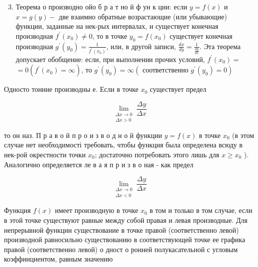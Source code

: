 \documentclass[10pt]{article}
\begin{document}
\begin{enumerate}

  \setcounter{enumi}{2}

  \item Теорема о производно ойо б р а т но й ф ун к ции: если $y=f(x)$ и $x=g(y)-$ две взаимно обратные возрастающие (или убывающие) функции, заданные на нек-рых интервалах, и существует конечная производная $f^{\prime}\left(x_{0}\right) \neq 0$, то в точке $y_{0}=f\left(x_{0}\right)$ существует конечная производная $g^{\prime}\left(y_{0}\right)=\frac{1}{f^{\prime}\left(x_{0}\right)}$, или, в другой записи, $\frac{d x}{d y}=\frac{1}{\frac{d y}{d x}}$. Эта теорема допускает обобщение: если, при выполнении прочих условий, $f^{\prime}\left(x_{0}\right)=$ $=0\left(f^{\prime}\left(x_{0}\right)=\infty\right)$, то $g^{\prime}\left(y_{0}\right)=\infty\left(\right.$ соответственно $\left.g^{\prime}\left(y_{0}\right)=0\right)$

\end{enumerate}



Односто тонние производны е. Если в точке $x_{0}$ существует предел



\[

\lim _{\substack{\Delta x \rightarrow 0 \\ \Delta x>0}} \frac{\Delta y}{\Delta x}

\]



то он наз. П р а в о й п р о и з в о д н о й функции $y=f(x)$ в точке $x_{0}$ (в этом случае нет необходимості требовать, чтобы функция была определена всюду в нек-рой окрестности точки $x_{0}$; достаточно потребовать этого лишь для $x \geqslant x_{0}$ ). Аналогично определяется ле в а я п р и з в о ная - как предел



\[

\lim _{\substack{\Delta x \rightarrow 0 \\ \Delta x<0}} \frac{\Delta y}{\Delta x}

\]



Функция $f(x)$ имеет производную в точке $x_{0}$ в том и только в том случае, если в этой точке существуют равные между собой правая и левая производные. Для непрерывной функции существование в точке правой (соответственно левой) производной равносильно существованию в соответствующей точке ее графика правой (соответственно левой) о дност о ронней полукасательной с угловым коэффиициентом, равным значению
\end{document}
